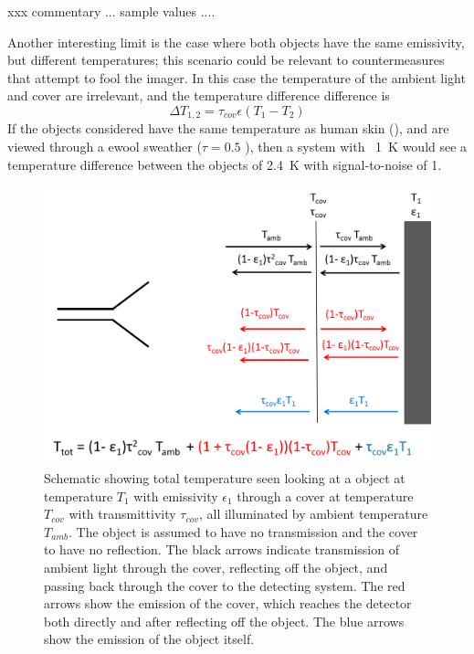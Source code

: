 xxx commentary ... sample values .... 

Another interesting limit is the case where both objects have the same emissivity, but different temperatures; this scenario could be relevant to countermeasures that attempt to fool the imager.
In this case the temperature of the ambient light and cover are irrelevant, and the temperature difference difference is
\begin{equation}
  \Delta T_{1,2} = \tau_{cov} \epsilon (T_1 - T_2)
\end{equation}
If the objects considered have the same temperature as human skin (), and are viewed through a ewool sweather ($\tau = 0.5$ \cite{}), then a system with \NETD\ \SI{1}{\K} would see a temperature difference between the objects of \SI{2.4}{\K} with signal-to-noise of 1.



\begin{figure}
\centering
\includegraphics[width=6in]{images/ch1-t-tot.png}
\caption[xxx]{
  Schematic showing total temperature seen looking at a object at temperature $T_1$ with emissivity $\epsilon_1$ through a cover at temperature $T_{cov}$ with transmittivity $\tau_{cov}$, all illuminated by ambient temperature $T_{amb}$.
  The object is assumed to have no transmission and the cover to have no reflection.
  The black arrows indicate transmission of ambient light through the cover, reflecting off the object, and passing back through the cover to the detecting system.
  The red arrows show the emission of the cover, which reaches the detector both directly and after reflecting off the object.
  The blue arrows show the emission of the object itself.
}
\label{fig:ch1-t-tot}
\end{figure}

